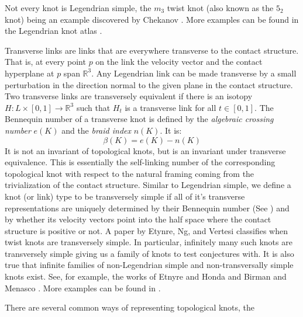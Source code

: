    Not every knot is Legendrian simple, the $m_{3}$ twist knot (also
    known as the $5_{2}$ knot) being an example discovered by Chekanov
    \cite{ChekanovDifAlgOfLegLinks}. More examples can be found in the
    Legendrian knot atlas \cite{LegendrianKnotAtlas}.
    \par\hfill\par
    Transverse links are links that are everywhere transverse to the
    contact structure. That is, at every point $p$ on the link the velocity
    vector and the contact hyperplane at $p$ span $\mathbb{R}^{3}$. Any Legendrian
    link can be made transverse by a small perturbation in the direction
    normal to the given plane in the contact structure.
    Two transverse links are transversely equivalent if there is an
    isotopy $H:L\times[0,1]\rightarrow\mathbb{R}^{3}$ such that $H_{t}$ is a
    transverse link for all $t\in[0,1]$. The Bennequin number of a
    transverse knot is defined by the \textit{algebraic crossing number}
    $e(K)$ and the \textit{braid index} $n(K)$. It is:
    \begin{equation}
        \beta(K)=e(K)-n(K)
    \end{equation}
    It is not an invariant of topological knots, but is an invariant under
    transverse equivalence. This is essentially the self-linking number of
    the corresponding topological knot with respect to the natural framing
    coming from the trivialization of the contact structure.
    Similar to Legendrian simple, we define a knot
    (or link) type to be transversely simple if all of it's transverse
    representations are uniquely determined by their Bennequin number
    (See \cite{BirmanWrinkleTransversallySimpleKnots}) and by whether its
    velocity vectors point into the half space where the contact structure
    is positive or not. A paper by Etynre, Ng, and Vertesi
    \cite{EtnyreEtAlLegendrianAndTransverseTwistKnots}
    classifies when twist knots are transversely simple. In
    particular, infinitely many such knots are transversely simple giving
    us a family of knots to test conjectures with. It is also true that
    infinite families of non-Legendrian simple and non-transversally simple
    knots exist. See, for example, the works of Etnyre and Honda
    \cite{EtnyreHondaCabling} and Birman and Menasco
    \cite{BirmanMenasco2006}. More examples can be found in
    \cite{vfoldvari2019legnonsimple}.
    \par\hfill\par
    There are several common ways of representing topological knots, the
